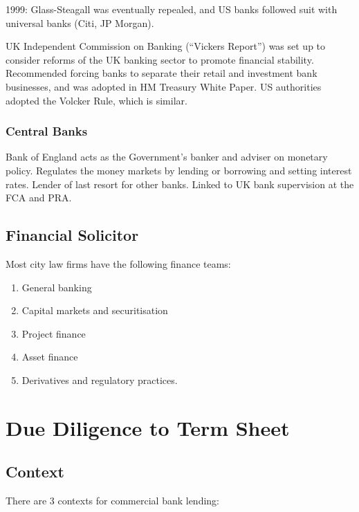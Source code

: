 \documentclass[
]{article}
\providecommand{\tightlist}{%
  \setlength{\itemsep}{0pt}\setlength{\parskip}{0pt}}
\begin{document}
1999: Glass-Steagall was eventually repealed, and US banks followed suit
with universal banks (Citi, JP Morgan).

UK Independent Commission on Banking (``Vickers Report'') was set up to
consider reforms of the UK banking sector to promote financial
stability. Recommended forcing banks to separate their retail and
investment bank businesses, and was adopted in HM Treasury White Paper.
US authorities adopted the Volcker Rule, which is similar.

\hypertarget{central-banks}{%
\subsubsection{Central Banks}\label{central-banks}}

Bank of England acts as the Government's banker and adviser on monetary
policy. Regulates the money markets by lending or borrowing and setting
interest rates. Lender of last resort for other banks. Linked to UK bank
supervision at the FCA and PRA.

\hypertarget{financial-solicitor}{%
\subsection{Financial Solicitor}\label{financial-solicitor}}

Most city law firms have the following finance teams:

\begin{enumerate}
\tightlist
\item
  General banking
\item
  Capital markets and securitisation
\item
  Project finance
\item
  Asset finance
\item
  Derivatives and regulatory practices.
\end{enumerate}

\hypertarget{due-diligence-to-term-sheet}{%
\section{Due Diligence to Term
Sheet}\label{due-diligence-to-term-sheet}}

\hypertarget{context}{%
\subsection{Context}\label{context}}

There are 3 contexts for commercial bank lending:
\end{document}
